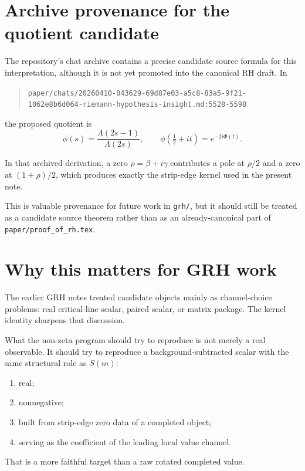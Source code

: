 \documentclass[11pt]{article}
\begin{document}
\section{Archive provenance for the quotient candidate}

The repository's chat archive contains a precise candidate source formula for
this interpretation, although it is not yet promoted into the canonical RH
draft. In

\begin{quote}
\texttt{paper/chats/20260410-043629-69d87e03-a5c8-83a5-9f21-1062e8b6d064-riemann-hypothesis-insight.md:5528-5598}
\end{quote}

the proposed quotient is
\[
\phi(s)=\frac{\Lambda(2s-1)}{\Lambda(2s)},
\qquad
\phi\!\left(\tfrac12+it\right)=e^{-2i\Phi(t)}.
\]

In that archived derivation, a zero \(\rho=\beta+i\gamma\) contributes a pole at
\(\rho/2\) and a zero at \((1+\rho)/2\), which produces exactly the strip-edge
kernel used in the present note.

This is valuable provenance for future work in \texttt{grh/}, but it should still be
treated as a candidate source theorem rather than as an already-canonical part
of \texttt{paper/proof_of_rh.tex}.

\section{Why this matters for GRH work}

The earlier GRH notes treated candidate objects mainly as channel-choice
problems: real critical-line scalar, paired scalar, or matrix package. The
kernel identity sharpens that discussion.

What the non-zeta program should try to reproduce is not merely a real
observable. It should try to reproduce a background-subtracted scalar with the
same structural role as \(S(m)\):

\begin{enumerate}
\item real;
\item nonnegative;
\item built from strip-edge zero data of a completed object;
\item serving as the coefficient of the leading local value channel.
\end{enumerate}

That is a more faithful target than a raw rotated completed value.
\end{document}
